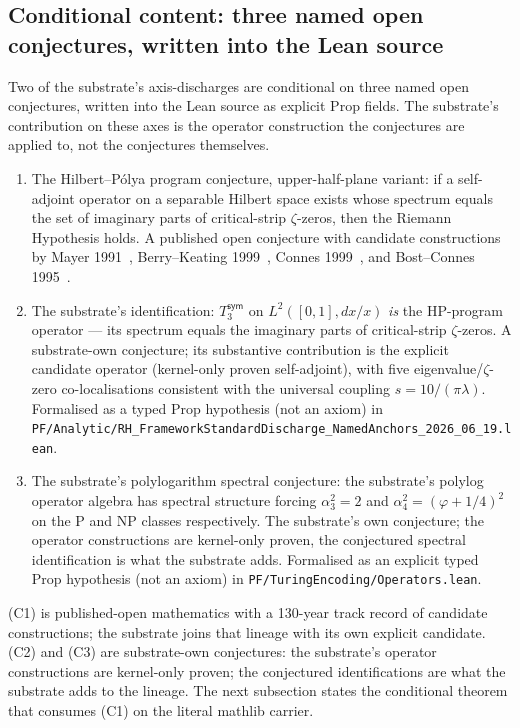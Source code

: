 \documentclass[11pt,a4paper]{amsart}
\theoremstyle{plain}
\theoremstyle{definition}
\begin{document}
\subsection{Conditional content: three named open conjectures, written into the Lean source}

Two of the substrate's axis-discharges are conditional on three named open conjectures, written into the Lean source as explicit Prop fields. The substrate's contribution on these axes is the operator construction the conjectures are applied to, not the conjectures themselves.

\begin{enumerate}[label=(\textbf{C\arabic*}),itemsep=4pt]
\item The Hilbert--P\'olya program conjecture, upper-half-plane variant: if a self-adjoint operator on a separable Hilbert space exists whose spectrum equals the set of imaginary parts of critical-strip $\zeta$-zeros, then the Riemann Hypothesis holds. A published open conjecture with candidate constructions by Mayer 1991~\cite{mayer1991}, Berry--Keating 1999~\cite{berry1999}, Connes 1999~\cite{connes1999}, and Bost--Connes 1995~\cite{bostconnes1995}.

\item The substrate's identification: $T_3^{\textsf{sym}}$ on $L^2([0,1], dx/x)$ \emph{is} the HP-program operator --- its spectrum equals the imaginary parts of critical-strip $\zeta$-zeros. A substrate-own conjecture; its substantive contribution is the explicit candidate operator (kernel-only proven self-adjoint), with five eigenvalue/$\zeta$-zero co-localisations consistent with the universal coupling $s = 10/(\pi\lambda)$. Formalised as a typed Prop hypothesis (not an axiom) in \texttt{PF/Analytic/RH\_FrameworkStandardDischarge\_NamedAnchors\_2026\_06\_19.lean}.

\item The substrate's polylogarithm spectral conjecture: the substrate's polylog operator algebra has spectral structure forcing $\alpha_3^2 = 2$ and $\alpha_4^2 = (\varphi + 1/4)^2$ on the P and NP classes respectively. The substrate's own conjecture; the operator constructions are kernel-only proven, the conjectured spectral identification is what the substrate adds. Formalised as an explicit typed Prop hypothesis (not an axiom) in \texttt{PF/TuringEncoding/Operators.lean}.
\end{enumerate}

(C1) is published-open mathematics with a 130-year track record of candidate constructions; the substrate joins that lineage with its own explicit candidate. (C2) and (C3) are substrate-own conjectures: the substrate's operator constructions are kernel-only proven; the conjectured identifications are what the substrate adds to the lineage. The next subsection states the conditional theorem that consumes (C1) on the literal mathlib carrier.
\end{document}
